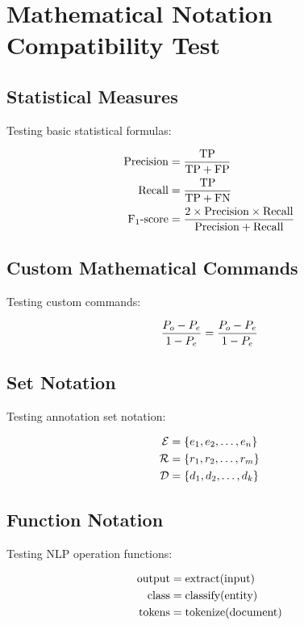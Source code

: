 \documentclass[11pt,a4paper]{article}
\begin{document}
\section{Mathematical Notation Compatibility Test}

\subsection{Statistical Measures}
Testing basic statistical formulas:

\begin{align}
\text{Precision} &= \frac{\text{TP}}{\text{TP} + \text{FP}} \\
\text{Recall} &= \frac{\text{TP}}{\text{TP} + \text{FN}} \\
\text{F}_1\text{-score} &= \frac{2 \times \text{Precision} \times \text{Recall}}{\text{Precision} + \text{Recall}}
\end{align}

\subsection{Custom Mathematical Commands}
Testing custom commands:

\begin{equation}
\frac{P_o - P_e}{1 - P_e} = \frac{P_o - P_e}{1 - P_e}
\end{equation}

\subsection{Set Notation}
Testing annotation set notation:

\begin{align}
\mathcal{E} &= \{e_1, e_2, \ldots, e_n\} \\
\mathcal{R} &= \{r_1, r_2, \ldots, r_m\} \\
\mathcal{D} &= \{d_1, d_2, \ldots, d_k\}
\end{align}

\subsection{Function Notation}
Testing NLP operation functions:

\begin{align}
\text{output} &= \text{extract}(\text{input}) \\
\text{class} &= \text{classify}(\text{entity}) \\
\text{tokens} &= \text{tokenize}(\text{document})
\end{align}
\end{document}
